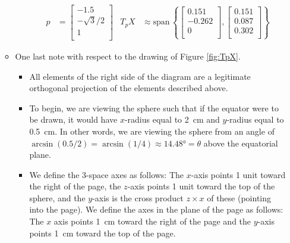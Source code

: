 \documentclass[../notes.tex]{subfiles}
\begin{document}
\begin{itemize}
\begin{itemize}
\begin{itemize}
            \begin{align*}
                p &=
                \begin{bmatrix}
                    -1.5\\
                    -\sqrt{3}/2\\
                    1\\
                \end{bmatrix}&
                T_pX &\approx \text{span}\,\left\{
                    \begin{bmatrix}
                        0.151\\
                        -0.262\\
                        0\\
                    \end{bmatrix},
                    \begin{bmatrix}
                        0.151\\
                        0.087\\
                        0.302\\
                    \end{bmatrix}
                \right\}
            \end{align*}
        \end{itemize}
        \item One last note with respect to the drawing of Figure \ref{fig:TpX}.
        \begin{itemize}
            \item All elements of the right side of the diagram are a legitimate orthogonal projection of the elements described above.
            \item To begin, we are viewing the sphere such that if the equator were to be drawn, it would have $x$-radius equal to \SI{2}{\centi\meter} and $y$-radius equal to \SI{0.5}{\centi\meter}. In other words, we are viewing the sphere from an angle of $\arcsin(0.5/2)=\arcsin(1/4)\approx\ang{14.48}=\theta$ above the equatorial plane.
            \item We define the 3-space axes as follows: The $x$-axis points 1 unit toward the right of the page, the $z$-axis points 1 unit toward the top of the sphere, and the $y$-axis is the cross product $z\times x$ of these (pointing into the page). We define the axes in the plane of the page as follows: The $x$ axis points \SI{1}{\centi\meter} toward the right of the page and the $y$-axis points \SI{1}{\centi\meter} toward the top of the page.

\end{itemize}
\end{itemize}
\end{itemize}
\end{document}
